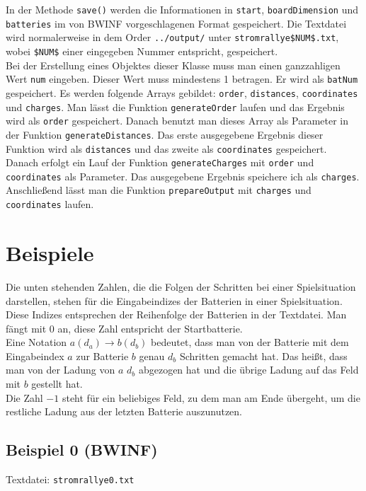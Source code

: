 \documentclass[a4paper,10pt,ngerman]{scrartcl}
\begin{document}
In der Methode \texttt{save()} werden die Informationen in \texttt{start}, \texttt{boardDimension} und \texttt{batteries}
im von BWINF vorgeschlagenen Format gespeichert. Die Textdatei wird normalerweise in dem Order \texttt{../output/}
unter \texttt{stromrallye\$NUM\$.txt}, wobei \texttt{\$NUM\$} einer eingegeben Nummer entspricht, gespeichert.\\

Bei der Erstellung eines Objektes dieser Klasse muss man einen ganzzahligen Wert \texttt{num} eingeben.
Dieser Wert muss mindestens 1 betragen. Er wird als \texttt{batNum} gespeichert.
Es werden folgende Arrays gebildet: \texttt{order}, \texttt{distances}, \texttt{coordinates} und \texttt{charges}.
Man lässt die Funktion \texttt{generateOrder} laufen und das Ergebnis wird als \texttt{order} gespeichert.
Danach benutzt man dieses Array als Parameter in der Funktion \texttt{generateDistances}.
Das erste ausgegebene Ergebnis dieser Funktion wird als \texttt{distances} und das zweite als \texttt{coordinates} gespeichert.
Danach erfolgt ein Lauf der Funktion \texttt{generateCharges} mit \texttt{order} und \texttt{coordinates} als Parameter.
Das ausgegebene Ergebnis speichere ich als \texttt{charges}.
Anschließend lässt man die Funktion \texttt{prepareOutput} mit \texttt{charges} und \texttt{coordinates} laufen.

\newpage
\section{Beispiele}
Die unten stehenden Zahlen, die die Folgen der Schritten bei einer Spielsituation darstellen, stehen für die Eingabeindizes
der Batterien in einer Spielsituation. Diese Indizes entsprechen der Reihenfolge der Batterien in der Textdatei. Man fängt mit 0 an,
diese Zahl entspricht der Startbatterie.\\
Eine Notation $a(d_a) \rightarrow b(d_b)$ bedeutet, dass man von der Batterie mit dem Eingabeindex $a$ zur Batterie $b$ genau $d_b$ Schritten
gemacht hat. Das heißt, dass man von der Ladung von $a$ $d_b$ abgezogen hat und die übrige Ladung auf das Feld mit $b$ gestellt hat.\\
Die Zahl $-1$ steht für ein beliebiges Feld, zu dem man am Ende übergeht, um die restliche Ladung aus der letzten Batterie auszunutzen.

\subsection{Beispiel 0 (BWINF)}\label{example:0}
Textdatei: \texttt{stromrallye0.txt}\\
\end{document}
